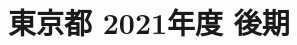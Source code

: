 \documentclass[../../hsm_tok_q.tex]{subfiles}
\begin{document}
    \section{東京都 2021年度 後期}
    \subsection{　}
    
    \newpage
    \subsection{　}
    
    \newpage
    \subsection{　}
    
    \newpage
    \subsection{　}
    
    \newpage
    \subsection{　}
    
\end{document}
